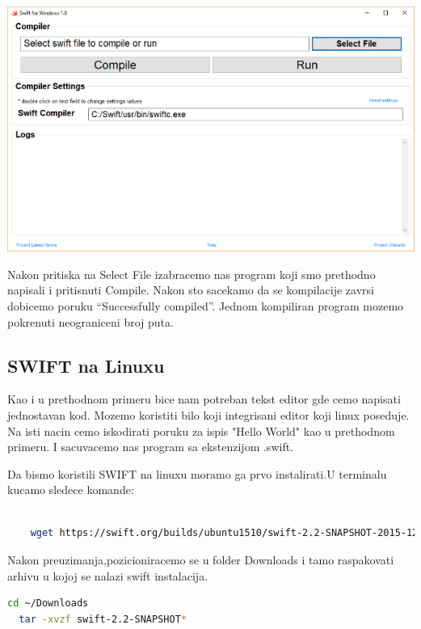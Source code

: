 \documentclass[a4paper]{article}
\begin{document}
\includegraphics[scale=0.4]{swift-win.png}
\vspace{5mm}


Nakon pritiska na Select File izabracemo nas program koji smo prethodno napisali i pritisnuti Compile. Nakon sto sacekamo da se kompilacije zavrsi dobicemo poruku “Successfully compiled”.
Jednom kompiliran program mozemo pokrenuti neograniceni broj puta.



\subsection{SWIFT na Linuxu}
\label{subsec:podnaslovLinux}

Kao i u prethodnom primeru bice nam potreban tekst editor gde cemo napisati jednostavan kod.
Mozemo koristiti bilo koji integrisani editor koji linux poseduje. Na isti nacin cemo iskodirati poruku za ispis "Hello World" kao u prethodnom primeru. I sacuvacemo nas program sa ekstenzijom .swift.

Da bismo koristili SWIFT na linuxu moramo ga prvo instalirati.U terminalu kucamo sledece komande:


\begin{lstlisting}[language=bash]

	wget https://swift.org/builds/ubuntu1510/swift-2.2-SNAPSHOT-2015-12-10-a/swift-2.2-SNAPSHOT-2015-12-10-a-ubuntu15.10.tar.gz

\end{lstlisting}
Nakon preuzimanja,pozicioniracemo se u folder Downloads i tamo raspakovati arhivu u kojoj se nalazi swift instalacija.



\begin{lstlisting}[language=bash]
  cd ~/Downloads
  tar -xvzf swift-2.2-SNAPSHOT*
\end{lstlisting}
\end{document}
